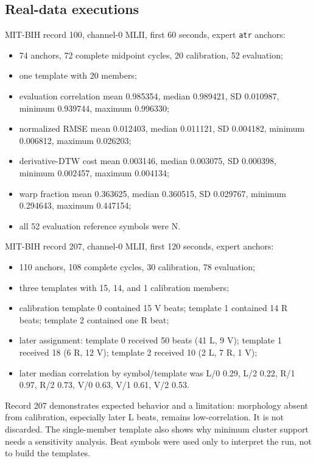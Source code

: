 \documentclass[11pt,a4paper]{article}
\begin{document}
\subsection{Real-data executions}

MIT-BIH record 100, channel-0 MLII, first 60 seconds, expert \texttt{atr} anchors:

\begin{itemize}
  \item 74 anchors, 72 complete midpoint cycles, 20 calibration, 52 evaluation;
  \item one template with 20 members;
  \item evaluation correlation mean 0.985354, median 0.989421, SD 0.010987, minimum 0.939744, maximum 0.996330;
  \item normalized RMSE mean 0.012403, median 0.011121, SD 0.004182, minimum 0.006812, maximum 0.026203;
  \item derivative-DTW cost mean 0.003146, median 0.003075, SD 0.000398, minimum 0.002457, maximum 0.004134;
  \item warp fraction mean 0.363625, median 0.360515, SD 0.029767, minimum 0.294643, maximum 0.447154;
  \item all 52 evaluation reference symbols were N.
\end{itemize}

MIT-BIH record 207, channel-0 MLII, first 120 seconds, expert anchors:

\begin{itemize}
  \item 110 anchors, 108 complete cycles, 30 calibration, 78 evaluation;
  \item three templates with 15, 14, and 1 calibration members;
  \item calibration template 0 contained 15 V beats; template 1 contained 14 R beats; template 2 contained one R beat;
  \item later assignment: template 0 received 50 beats (41 L, 9 V); template 1 received 18 (6 R, 12 V); template 2 received 10 (2 L, 7 R, 1 V);
  \item later median correlation by symbol/template was L/0 0.29, L/2 0.22, R/1 0.97, R/2 0.73, V/0 0.63, V/1 0.61, V/2 0.53.
\end{itemize}

Record 207 demonstrates expected behavior and a limitation: morphology absent from calibration, especially later L beats, remains low-correlation. It is not discarded. The single-member template also shows why minimum cluster support needs a sensitivity analysis. Beat symbols were used only to interpret the run, not to build the templates.
\end{document}
